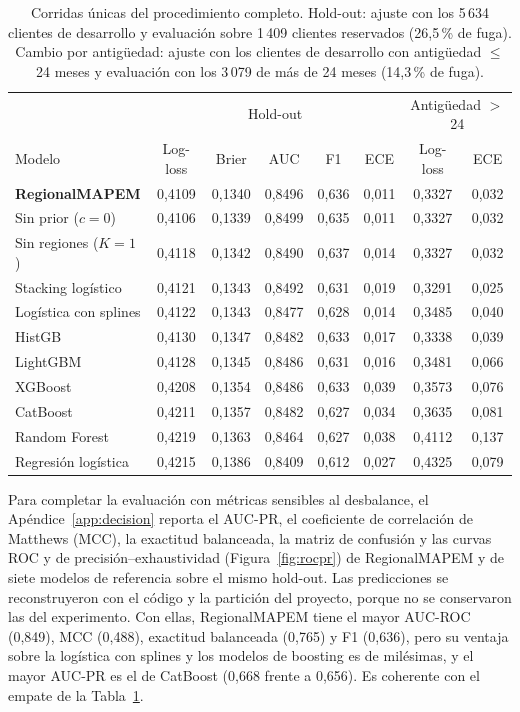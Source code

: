 \documentclass[11pt,a4paper]{article}
\begin{document}
\begin{table}[t]
\centering
\caption{Corridas únicas del procedimiento completo. Hold-out: ajuste con los 5\,634 clientes de desarrollo y evaluación sobre 1\,409 clientes reservados (26,5\,\% de fuga). Cambio por antigüedad: ajuste con los clientes de desarrollo con antigüedad $\le$ 24 meses y evaluación con los 3\,079 de más de 24 meses (14,3\,\% de fuga).}
\label{tab:holdout}
\footnotesize
\setlength{\tabcolsep}{4pt}
\begin{tabular}{lccccc|cc}
\toprule
 & \multicolumn{5}{c|}{Hold-out} & \multicolumn{2}{c}{Antigüedad $>$ 24} \\
Modelo & Log-loss & Brier & AUC & F1 & ECE & Log-loss & ECE \\
\midrule
\textbf{RegionalMAPEM} & 0{,}4109 & 0{,}1340 & 0{,}8496 & 0{,}636 & 0{,}011 & 0{,}3327 & 0{,}032 \\
Sin prior ($c=0$) & 0{,}4106 & 0{,}1339 & 0{,}8499 & 0{,}635 & 0{,}011 & 0{,}3327 & 0{,}032 \\
Sin regiones ($K=1$) & 0{,}4118 & 0{,}1342 & 0{,}8490 & 0{,}637 & 0{,}014 & 0{,}3327 & 0{,}032 \\
Stacking logístico & 0{,}4121 & 0{,}1343 & 0{,}8492 & 0{,}631 & 0{,}019 & 0{,}3291 & 0{,}025 \\
Logística con splines & 0{,}4122 & 0{,}1343 & 0{,}8477 & 0{,}628 & 0{,}014 & 0{,}3485 & 0{,}040 \\
HistGB & 0{,}4130 & 0{,}1347 & 0{,}8482 & 0{,}633 & 0{,}017 & 0{,}3338 & 0{,}039 \\
LightGBM & 0{,}4128 & 0{,}1345 & 0{,}8486 & 0{,}631 & 0{,}016 & 0{,}3481 & 0{,}066 \\
XGBoost & 0{,}4208 & 0{,}1354 & 0{,}8486 & 0{,}633 & 0{,}039 & 0{,}3573 & 0{,}076 \\
CatBoost & 0{,}4211 & 0{,}1357 & 0{,}8482 & 0{,}627 & 0{,}034 & 0{,}3635 & 0{,}081 \\
Random Forest & 0{,}4219 & 0{,}1363 & 0{,}8464 & 0{,}627 & 0{,}038 & 0{,}4112 & 0{,}137 \\
Regresión logística & 0{,}4215 & 0{,}1386 & 0{,}8409 & 0{,}612 & 0{,}027 & 0{,}4325 & 0{,}079 \\
\bottomrule
\end{tabular}
\end{table}

Para completar la evaluación con métricas sensibles al desbalance, el Apéndice~\ref{app:decision} reporta el AUC-PR, el coeficiente de correlación de Matthews (MCC), la exactitud balanceada, la matriz de confusión y las curvas ROC y de precisión--exhaustividad (Figura~\ref{fig:rocpr}) de RegionalMAPEM y de siete modelos de referencia sobre el mismo hold-out. Las predicciones se reconstruyeron con el código y la partición del proyecto, porque no se conservaron las del experimento. Con ellas, RegionalMAPEM tiene el mayor AUC-ROC (0,849), MCC (0,488), exactitud balanceada (0,765) y F1 (0,636), pero su ventaja sobre la logística con splines y los modelos de boosting es de milésimas, y el mayor AUC-PR es el de CatBoost (0,668 frente a 0,656). Es coherente con el empate de la Tabla~\ref{tab:holdout}.
\end{document}
